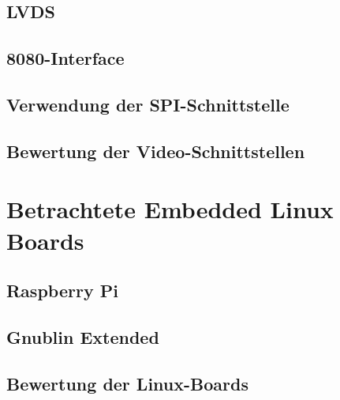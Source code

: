 \subsection{LVDS}
\subsection{8080-Interface}
\subsection{Verwendung der SPI-Schnittstelle}
\subsection{Bewertung der Video-Schnittstellen}

\section{Betrachtete Embedded Linux Boards}
\subsection{Raspberry Pi}
\subsection{Gnublin Extended}
\subsection{Bewertung der Linux-Boards}
